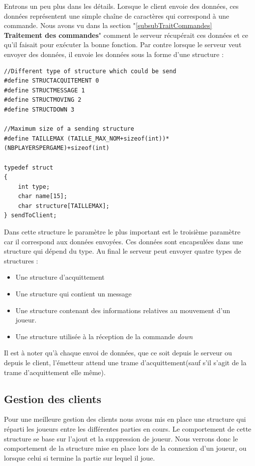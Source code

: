 \documentclass[a4paper,10pt]{article}
\begin{document}
	Entrons un peu plus dans les détails. Lorsque le client envoie des données, ces données représentent une simple chaîne de caractères qui correspond à une
commande. Nous avons vu dans la section "\ref{subsubTraitCommandes} \textbf{Traitement des commandes}" comment le serveur récupérait ces données et ce qu'il
faisait pour exécuter la bonne fonction. Par contre lorsque le serveur veut envoyer des données, il envoie les données sous la forme d'une structure :
\begin{lstlisting}
//Different type of structure which could be send
#define STRUCTACQUITEMENT 0
#define STRUCTMESSAGE 1
#define STRUCTMOVING 2
#define STRUCTDOWN 3

//Maximum size of a sending structure
#define TAILLEMAX (TAILLE_MAX_NOM+sizeof(int))*(NBPLAYERSPERGAME)+sizeof(int)

typedef struct
{
    int type;
    char name[15];
    char structure[TAILLEMAX];
} sendToClient;
\end{lstlisting}

	Dans cette structure le paramètre le plus important est le troisième paramètre car il correspond aux données envoyées. Ces données sont encapsulées dans une
structure qui dépend du type. Au final le serveur peut envoyer quatre types de structures :
	\begin{itemize}
		\item Une structure d’acquittement
		\item Une structure qui contient un message
		\item Une structure contenant des informations relatives au mouvement d'un joueur.
		\item Une structure utilisée à la réception de la commande \emph{down}
	\end{itemize}

	Il est à noter qu'à chaque envoi de données, que ce soit depuis le serveur ou depuis le client, l’émetteur attend une trame d'acquittement(sauf s'il
s'agit de la trame d'acquittement elle même).



	\subsection{Gestion des clients}
	\label{subGestionClient}

	 Pour une meilleure gestion des clients nous avons mis en place une structure qui réparti les joueurs entre les différentes parties en cours.
	 Le comportement de cette structure se base sur l'ajout et la suppression de joueur. Nous verrons donc le comportement de la structure mise en place lors
de la connexion d'un joueur, ou lorsque celui si termine la partie sur lequel il joue.
\end{document}
